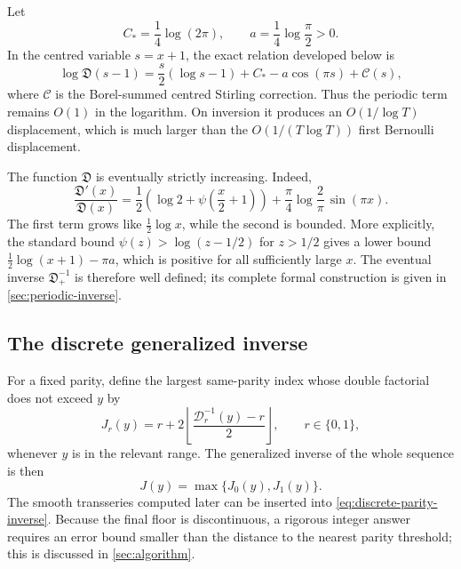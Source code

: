 \documentclass[11pt,a4paper,oneside]{article}
\theoremstyle{plain}
\theoremstyle{definition}
\theoremstyle{remark}
\newcommand{\D}{\mathcal D}
\newcommand{\DO}{\mathfrak D}
\begin{document}
Let
\begin{equation}
 C_*=\frac14\log(2\pi),
 \qquad a=\frac14\log\frac\pi2>0.
 \label{eq:mean-periodic-constants}
\end{equation}
In the centred variable $s=x+1$, the exact relation developed below is
\begin{equation}
 \log\DO(s-1)
 =\frac{s}{2}(\log s-1)+C_*-a\cos(\pi s)+\mathcal C(s),
 \label{eq:OEIS-centered-exact}
\end{equation}
where $\mathcal C$ is the Borel-summed centred Stirling correction.  Thus the
periodic term remains $O(1)$ in the logarithm.  On inversion it produces an
$O(1/\log T)$ displacement, which is much larger than the
$O(1/(T\log T))$ first Bernoulli displacement.

The function $\DO$ is eventually strictly increasing.  Indeed,
\begin{equation}
 \frac{\DO'(x)}{\DO(x)}
 =\frac12\left(\log2+\psi\!\left(\frac{x}{2}+1\right)\right)
 +\frac{\pi}{4}\log\frac2\pi\,\sin(\pi x).
 \label{eq:OEIS-logder}
\end{equation}
The first term grows like $\tfrac12\log x$, while the second is bounded.
More explicitly, the standard bound
$\psi(z)>\log(z-1/2)$ for $z>1/2$ gives a lower bound
$\tfrac12\log(x+1)-\pi a$, which is positive for all sufficiently large $x$.
The eventual inverse $\DO_+^{-1}$ is therefore well defined; its complete
formal construction is given in \cref{sec:periodic-inverse}.

\subsection{The discrete generalized inverse}

For a fixed parity, define the largest same-parity index whose double
factorial does not exceed $y$ by
\begin{equation}
 J_r(y)=r+2\left\lfloor\frac{\D_r^{-1}(y)-r}{2}\right\rfloor,
 \qquad r\in\{0,1\},
 \label{eq:discrete-parity-inverse}
\end{equation}
whenever $y$ is in the relevant range.  The generalized inverse of the whole
sequence is then
\begin{equation}
 J(y)=\max\{J_0(y),J_1(y)\}.
 \label{eq:discrete-global-inverse}
\end{equation}
The smooth transseries computed later can be inserted into
\cref{eq:discrete-parity-inverse}.  Because the final floor is discontinuous,
a rigorous integer answer requires an error bound smaller than the distance to
the nearest parity threshold; this is discussed in \cref{sec:algorithm}.
\end{document}
